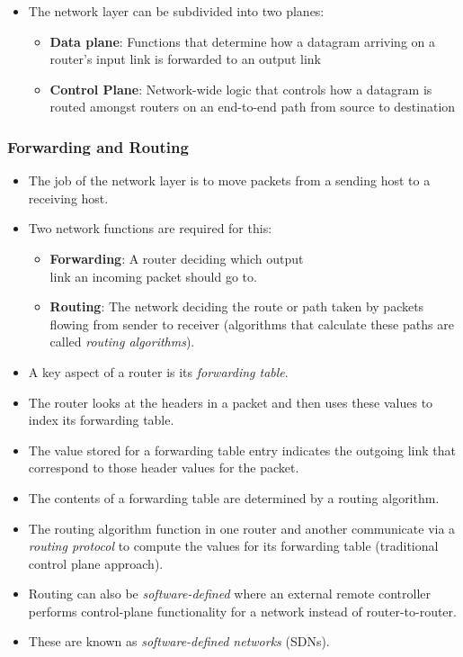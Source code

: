 \documentclass{article}
\begin{document}
\begin{itemize}
    \item The network layer can be subdivided into two planes:
    \begin{itemize}
        \item \textbf{Data plane}: Functions that determine how a datagram arriving on a router's input link is forwarded to an output link
        \item \textbf{Control Plane}: Network-wide logic that controls how a datagram is routed amongst routers on an end-to-end path from source to destination
    \end{itemize}
\end{itemize} 

\subsubsection{Forwarding and Routing}

\begin{itemize}
    \item The job of the network layer is to move packets from a sending host to a receiving host.
    \item Two network functions are required for this:
    \begin{itemize}
        \item \textbf{Forwarding}: A router deciding which output \\ link an incoming packet should go to.
        \item \textbf{Routing}: The network deciding the route or path taken by packets flowing from sender to receiver (algorithms that calculate these paths are called \emph{routing algorithms}).
    \end{itemize}
    \item A key aspect of a router is its \emph{forwarding table}.
    \item The router looks at the headers in a packet and then uses these values to index its forwarding table.
    \item The value stored for a forwarding table entry indicates the outgoing link that correspond to those header values for the packet.
    \item The contents of a forwarding table are determined by a routing algorithm.
    \item The routing algorithm function in one router and another communicate via a \emph{routing protocol} to compute the values for its forwarding table (traditional control plane approach).
    \item Routing can also be \emph{software-defined} where an external remote controller performs control-plane functionality for a network instead of router-to-router.
    \item These are known as \emph{software-defined networks} (SDNs).
\end{itemize}
\end{document}
